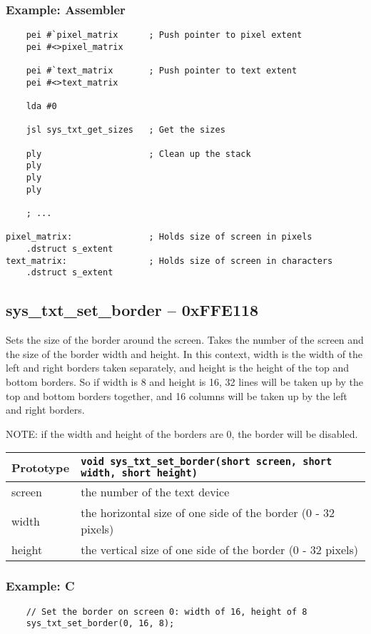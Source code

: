 \subsubsection*{Example: Assembler}
\begin{verbatim}
    pei #`pixel_matrix      ; Push pointer to pixel extent
    pei #<>pixel_matrix

    pei #`text_matrix       ; Push pointer to text extent
    pei #<>text_matrix

    lda #0

    jsl sys_txt_get_sizes   ; Get the sizes

    ply                     ; Clean up the stack
    ply
    ply
    ply

    ; ...

pixel_matrix:               ; Holds size of screen in pixels
    .dstruct s_extent
text_matrix:                ; Holds size of screen in characters
    .dstruct s_extent
\end{verbatim}


\subsection*{sys\_txt\_set\_border -- 0xFFE118}
Sets the size of the border around the screen. Takes the number of the screen and the size of the border width and height. In this context, width is the width of the left and right borders taken separately, and height is the height of the top and bottom borders. So if width is 8 and height is 16, 32 lines will be taken up by the top and bottom borders together, and 16 columns will be taken up by the left and right borders.

NOTE: if the width and height of the borders are 0, the border will be disabled.

\bigskip

\begin{tabular}{|l||l|} \hline
Prototype & \lstinline!void sys_txt_set_border(short screen, short width, short height)! \\ \hline
screen & the number of the text device \\ \hline
width & the horizontal size of one side of the border (0 - 32 pixels) \\ \hline
height & the vertical size of one side of the border (0 - 32 pixels) \\ \hline
\end{tabular}

\subsubsection*{Example: C}
\begin{lstlisting}
    // Set the border on screen 0: width of 16, height of 8
    sys_txt_set_border(0, 16, 8);
\end{lstlisting}

